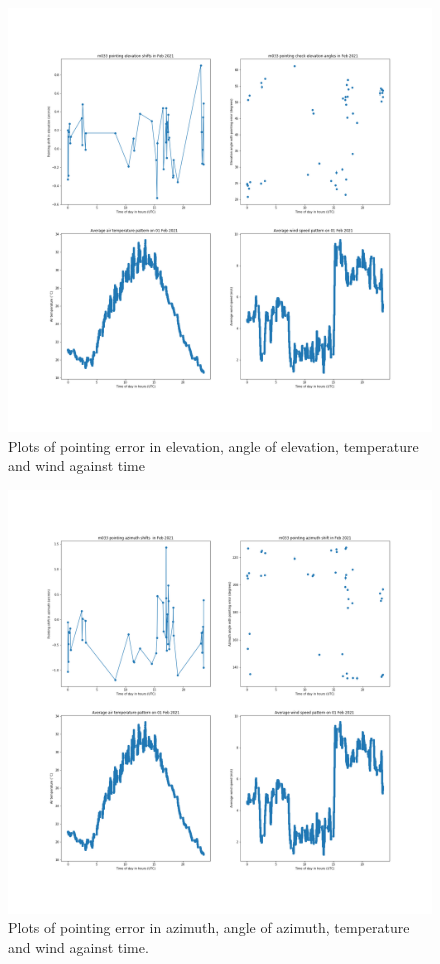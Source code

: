 \documentclass{article}
\begin{document}
\begin{figure}[H]
	\centering
	\includegraphics[scale=0.35]{m033_elev_Feb.png}
	
	\caption{Plots of pointing error in elevation, angle of elevation, temperature and wind against time}
	\label{fig:m033ElevFeb}
\end{figure}

\begin{figure}[H]
	\centering
	\includegraphics[scale=0.35]{m033_azim_Feb.png}
	
	\caption{Plots of pointing error in azimuth, angle of azimuth, temperature and wind against time.}
	\label{fig:m033AzimFeb}
\end{figure}
\end{document}
